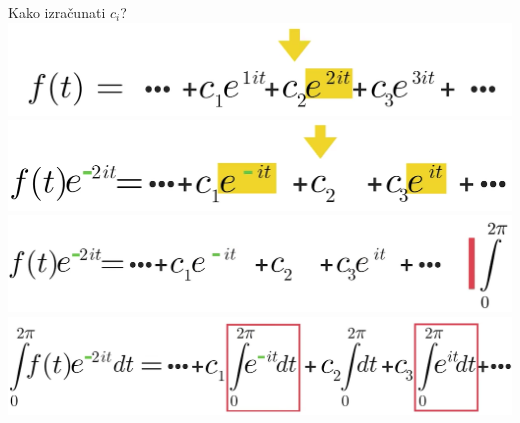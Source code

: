\documentclass{beamer}
\begin{document}
\begin{frame}{Kako izra\v{c}unati $c_i$?}
    \centering
    \includegraphics[scale=0.3]{images/ep9.PNG}
    \includegraphics[scale=0.3]{images/ep11.PNG}
    \includegraphics[scale=0.3]{images/ep12.PNG}
    \includegraphics[scale=0.3]{images/ep13.PNG}
\end{frame}
\end{document}

